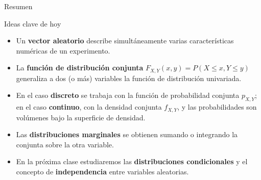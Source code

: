 \documentclass[aspectratio=169,11pt]{beamer}
\begin{document}
\begin{frame}{Resumen}
\begin{block}{Ideas clave de hoy}
\begin{itemize}
\item Un \textbf{vector aleatorio} describe simultáneamente varias características numéricas de un experimento.
\item La \textbf{función de distribución conjunta} $F_{X,Y}(x,y)=P(X\le x, Y\le y)$ generaliza a dos (o más) variables la función de distribución univariada.
\item En el caso \textbf{discreto} se trabaja con la función de probabilidad conjunta $p_{X,Y}$; en el caso \textbf{continuo}, con la densidad conjunta $f_{X,Y}$, y las probabilidades son volúmenes bajo la superficie de densidad.
\item Las \textbf{distribuciones marginales} se obtienen sumando o integrando la conjunta sobre la otra variable.
\item En la próxima clase estudiaremos las \textbf{distribuciones condicionales} y el concepto de \textbf{independencia} entre variables aleatorias.
\end{itemize}
\end{block}
\end{frame}
\end{document}
